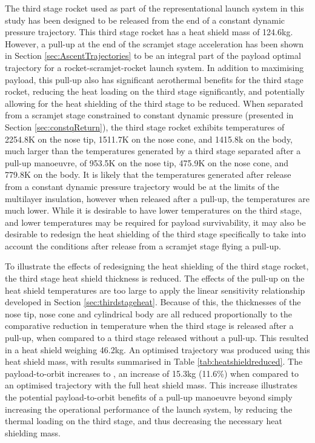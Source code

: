 The third stage rocket used as part of the representational launch system in this study has been designed to be released from the end of a constant dynamic pressure trajectory\cite{Preller2018a}. This third stage rocket has a heat shield mass of 124.6kg. However, a pull-up at the end of the scramjet stage acceleration has been shown in Section \ref{sec:AscentTrajectories} to be an integral part of the payload optimal trajectory for a rocket-scramjet-rocket launch system. In addition to maximising payload, this pull-up also has significant aerothermal benefits for the third stage rocket, reducing the heat loading on the third stage significantly, and potentially allowing for the heat shielding of the third stage to be reduced. When separated from a scramjet stage constrained to constant dynamic pressure (presented in Section \ref{sec:constqReturn}), the third stage rocket exhibits temperatures of 2254.8K on the nose tip, 1511.7K on the nose cone, and 1415.8k on the body, much larger than the temperatures generated by a third stage separated after a pull-up manoeuvre, of 953.5K on the nose tip, 475.9K on the nose cone, and 779.8K on the body. It is likely that the temperatures generated after release from a constant dynamic pressure trajectory would be at the limits of the multilayer insulation, however when released after a pull-up, the temperatures are much lower. While it is desirable to have lower temperatures on the third stage, and lower temperatures may be required for payload survivability, it may also be desirable to redesign the heat shielding of the third stage specifically to take into account the conditions after release from a scramjet stage flying a pull-up. 

To illustrate the effects of redesigning the heat shielding of the third stage rocket, the third stage heat shield thickness is reduced. The effects of the pull-up on the heat shield temperatures are too large to apply the linear sensitivity relationship developed in Section \ref{sec:thirdstageheat}. Because of this, the thicknesses of the nose tip, nose cone and cylindrical body are all reduced proportionally to the comparative reduction in temperature when the third stage is released after a pull-up, when compared to a third stage released without a pull-up. This resulted in a heat shield weighing 46.2kg. An optimised trajectory was produced using this heat shield mass, with results summarised in Table \ref{tab:heatshieldreduced}. The payload-to-orbit increases to \PayloadToOrbitTPSreduced, an increase of 15.3kg (11.6\%) when compared to an optimised trajectory with the full heat shield mass. This increase illustrates the potential payload-to-orbit benefits of a pull-up manoeuvre beyond simply increasing the operational performance of the launch system, by reducing the thermal loading on the third stage, and thus decreasing the necessary heat shielding mass. 

